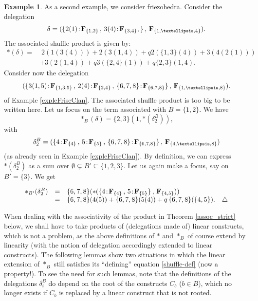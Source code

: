 \documentclass[11pt]{article}
\theoremstyle{definition}
\newtheorem{example}[theo]{Example}
\numberwithin{equation}{section}
\numberwithin{equation}{section}
\newcommand\xqed[1]{%
  \leavevmode\unskip\penalty9999 \hbox{}\nobreak\hfill
  \quad\hbox{#1}}
\newcommand\demo{\xqed{$\triangle$}}
\newcommand{\inc}{\subseteq}
\newcommand{\set}[1]{\{#1\}}
\newcommand{\hyper}[1]{{\bf #1}}
\newcommand{\incs}{\subsetneq}
\begin{document}
\begin{example} \label{expleFriseProduit}  As a second example, we consider  friezohedra.  Consider the delegation $$\delta=(\{2(1)\!:\! \hyper{F}_{\{1,2\}}\,,\, 3(4)\!:\! \hyper{F}_{\{3,4\}},  \}\,,\, \hyper{F}_{\{1,\ldots,4\}}).$$ The associated   shuffle product is given by:
\begin{align*}
\ast(\delta)= &\;2(1(3(4))) + 2(3(1,4)) + q2(\{1,3\}(4))+ 3(4(2(1)))\\
& +3(2(1,4)) + q3(\{2,4\}(1)) + q\{2,3\}(1,4).
\end{align*}
Consider now the delegation 
\begin{equation*}
(\{3(1,5) \!:\! \hyper{F}_{\{1,3,5\}}\,,\,2(4) \!:\! \hyper{F}_{\{2,4\}} \,,\,\{6,7,8\} \!:\! \hyper{F}_{\{6,7,8\}}\}\,,\, \hyper{F}_{\{1,\ldots,8\}}).
\end{equation*}
of Example \ref{expleFriseClan}.
 The associated   shuffle product is too big to be written here. Let us focus on the term associated with $B=\{1,2\}$. 
 We have  $$\ast_B(\delta)=\{2,3\}(1, \ast(\delta_2^B)),$$  with  $$\delta_2^B=(\{ 4 \!:\! \hyper{F}_{\{4\}}\,,\, 5 \!:\! \hyper{F}_{\{5\}}\,,\, \{6,7,8\} \!:\! \hyper{F}_{\{6,7,8\}}\}\,,\, \hyper{F}_{\{4,\ldots, 8\}})$$  (as already seen in Example \ref{expleFriseClan}). By definition, we can express $\ast(\delta_2^B)$   as a sum over $\emptyset \incs B' \inc \{1,2,3\}$. Let us  again make a focus, say on $B'=\set{3}$. We get 
 
$$\begin{array}{rcl}
\ast_{B'}(\delta_2^B)&=&\{6,7,8\}(\ast(\{4 \!:\! \hyper{F}_{\{4\}}\,,\, 5 \!:\! \hyper{F}_{\{5\}}\}\,,\, \hyper{F}_{\{4,5\}})) \\
& = &\{6,7,8\}(4(5)) + \{6,7,8\}(5(4)) + q \,\{6,7,8\}(\{4,5\}). \quad\demo
\end{array}$$

\end{example}

When dealing with the associativity of the   product in Theorem \ref{assoc_strict} below, we shall have to take    products of (delegations made of)  linear constructs, which is not a problem, as the above definitions of $\ast$ and $\ast_B$ of course extend by linearity (with the notion of delegation accordingly extended to linear constructs). 
 The following lemmas show two situations in which the linear extension of $\ast_B$ still satisfies its ``defining'' equation \ref{shuffle-def}
(now a property!). To see the need for such  lemmas, note that the definitions of the delegations $\delta^B_i$ do depend on the root of the constructs $C_b$ ($b\in B$), which no longer exists if $C_b$ is replaced by a linear construct that is not rooted.
 
\end{document}
